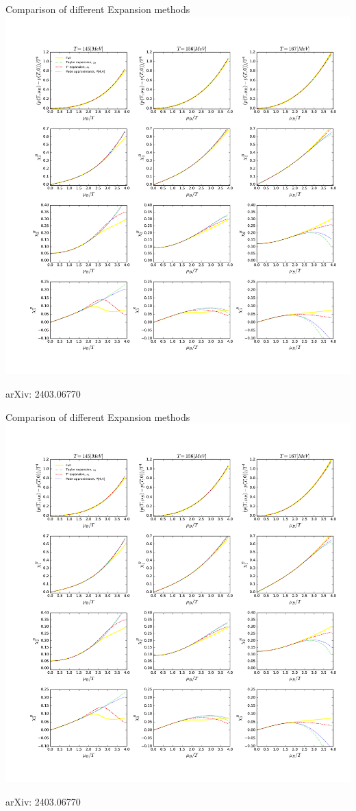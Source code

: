 \begin{frame}[fragile]{Comparison of different Expansion methods}
    \centering
    \includegraphics[width=1.\linewidth,trim={2cm 17cm 0 2.9cm}, clip]{Images/Figures/FixT.pdf}
    {\centering \scriptsize arXiv: 2403.06770 \par}
\end{frame}
\begin{frame}[fragile]{Comparison of different Expansion methods}
    \centering
    \includegraphics[width=1.\linewidth,trim={2cm 2cm 0 18cm}, clip]{Images/Figures/FixT.pdf}
    {\centering \scriptsize arXiv: 2403.06770 \par}
\end{frame}
